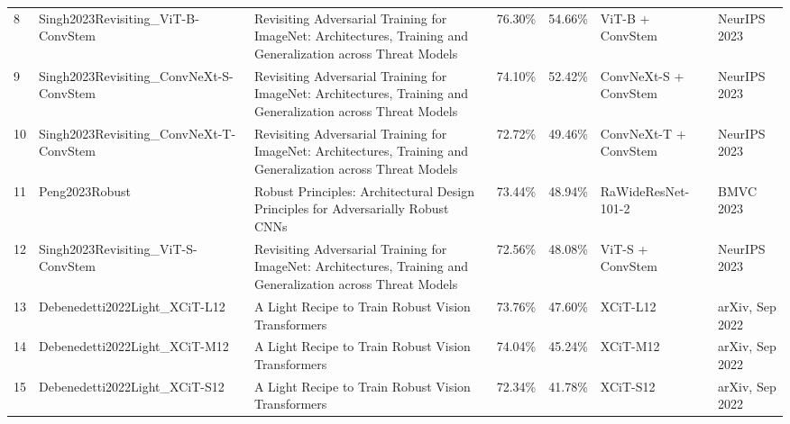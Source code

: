 \begin{table}[]
{\begin{tabular}{lllllll}
    8  & Singh2023Revisiting\_ViT-B-ConvStem      & Revisiting Adversarial Training for ImageNet: Architectures, Training and Generalization across Threat Models & 76.30\%        & 54.66\%         & ViT-B + ConvStem      & NeurIPS 2023                                               \\
    9  & Singh2023Revisiting\_ConvNeXt-S-ConvStem & Revisiting Adversarial Training for ImageNet: Architectures, Training and Generalization across Threat Models & 74.10\%        & 52.42\%         & ConvNeXt-S + ConvStem & NeurIPS 2023                                               \\
    10 & Singh2023Revisiting\_ConvNeXt-T-ConvStem & Revisiting Adversarial Training for ImageNet: Architectures, Training and Generalization across Threat Models & 72.72\%        & 49.46\%         & ConvNeXt-T + ConvStem & NeurIPS 2023                                               \\
    11 & Peng2023Robust                           & Robust Principles: Architectural Design Principles for Adversarially Robust CNNs                              & 73.44\%        & 48.94\%         & RaWideResNet-101-2    & BMVC 2023                                                  \\
    12 & Singh2023Revisiting\_ViT-S-ConvStem      & Revisiting Adversarial Training for ImageNet: Architectures, Training and Generalization across Threat Models & 72.56\%        & 48.08\%         & ViT-S + ConvStem      & NeurIPS 2023                                               \\
    13 & Debenedetti2022Light\_XCiT-L12           & A Light Recipe to Train Robust Vision Transformers                                                            & 73.76\%        & 47.60\%         & XCiT-L12              & arXiv, Sep 2022                                            \\
    14 & Debenedetti2022Light\_XCiT-M12           & A Light Recipe to Train Robust Vision Transformers                                                            & 74.04\%        & 45.24\%         & XCiT-M12              & arXiv, Sep 2022                                            \\
    15 & Debenedetti2022Light\_XCiT-S12           & A Light Recipe to Train Robust Vision Transformers                                                            & 72.34\%        & 41.78\%         & XCiT-S12              & arXiv, Sep 2022                                            \\

\end{tabular}}
\end{table}
